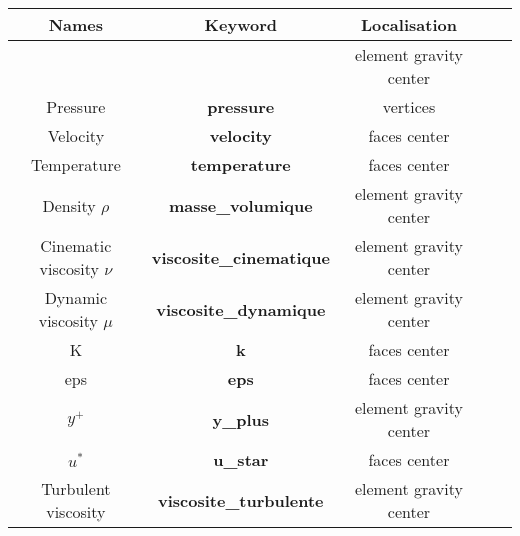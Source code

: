 \begin{longtable}[h!]{|c|c|c|c|c|}
\hline 
\textbf{Names}              & \textbf{Keyword}                  & \textbf{Localisation}     \\ \hline
\hline
                            &                                   & element gravity center    \\
Pressure                    & \textbf{pressure}                 & vertices                  \\ \hline
Velocity                    & \textbf{velocity}                 & faces center              \\ \hline
Temperature                 & \textbf{temperature}              & faces center              \\ \hline
\hline
Density $\rho$              & \textbf{masse\_volumique}         & element gravity center    \\ \hline
Cinematic viscosity $\nu$   & \textbf{viscosite\_cinematique}   & element gravity center    \\ \hline
Dynamic viscosity $\mu$     & \textbf{viscosite\_dynamique}     & element gravity center    \\ \hline
\hline
K                           & \textbf{k}                        & faces center              \\ \hline
eps                         & \textbf{eps}                      & faces center              \\ \hline
$y^+$                       & \textbf{y\_plus}                  & element gravity center    \\ \hline
$u^*$                       & \textbf{u\_star}                  & faces center              \\ \hline
Turbulent viscosity         & \textbf{viscosite\_turbulente}    & element gravity center    \\ \hline
\end{longtable}



